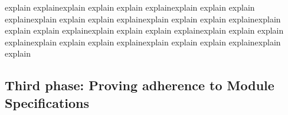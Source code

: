 {%
%
%
%

explain explainexplain explain explain explainexplain explain explain explainexplain explain explain explainexplain explain
explain explainexplain explain explain explainexplain explain explain explainexplain explain explain explainexplain explain
explain explainexplain explain explain explainexplain explain



\subsection{Third phase: Proving adherence to Module Specifications}
\label{sect:wf}

}
